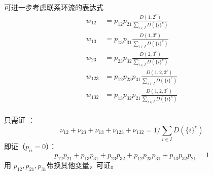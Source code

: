 \documentclass[cn,hazy,egreen,14pt,normal]{elegantnote}
\begin{document}
可进一步考虑联系环流的表达式
\begin{align*}
    w_{12} &= p_{12}p_{21} \frac{D({1, 2}^c)}{\sum_{i\in I} D(\{i\}^c)} \\
    w_{13} &= p_{13}p_{31} \frac{D({1, 3}^c)}{\sum_{i\in I} D(\{i\}^c)} \\
    w_{23} &= p_{23}p_{32} \frac{D({2, 3}^c)}{\sum_{i\in I} D(\{i\}^c)} \\
    w_{123} &= p_{12}p_{23}p_{31} \frac{D({1, 2, 3}^c)}{\sum_{i\in I} D(\{i\}^c)} \\
    w_{132} &= p_{13}p_{32}p_{21} \frac{D({1, 2, 3}^c)}{\sum_{i\in I} D(\{i\}^c)} \\
\end{align*}

只需证 ：
$$
\nu_{12} + \nu_{23} + \nu_{13} + \nu_{123} + \nu_{132} = 1 / \sum_{i\in I} D(\{i\}^c)
$$
即证（$p_{ii}=0$）：
$$
p_{12}p_{21} + p_{13}p_{31} + p_{23}p_{32} + p_{12}p_{23}p_{31} + p_{13}p_{32}p_{21} = 1
$$
用 $p_{12}, p_{21}, p_{31}$带换其他变量，可证。
\end{document}

